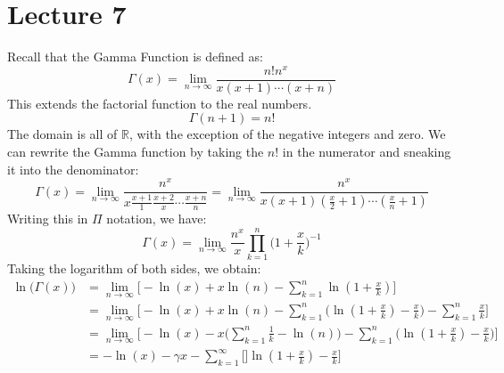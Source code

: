     \section{Lecture 7}
        Recall that the Gamma Function is defined as:
        \begin{equation}
            \Gamma(x)=
            \underset{n\rightarrow\infty}{\lim}
                \frac{n!n^{x}}{x(x+1)\cdots(x+n)}
        \end{equation}
        This extends the factorial function to the real numbers.
        \begin{equation}
            \Gamma(n+1)=n!
        \end{equation}
        The domain is all of $\mathbb{R}$, with the exception of
        the negative integers and zero. We can rewrite the
        Gamma function by taking the $n!$ in the numerator and
        sneaking it into the denominator:
        \begin{equation}
            \Gamma(x)=
            \underset{n\rightarrow\infty}{\lim}
            \frac{n^{x}}
                 {x\frac{x+1}{1}\frac{x+2}{x}\cdots\frac{x+n}{n}}
            =\underset{n\rightarrow\infty}{\lim}
            \frac{n^{x}}
                 {x(x+1)(\frac{x}{2}+1)\cdots(\frac{x}{n}+1)}
        \end{equation}
        Writing this in $\Pi$ notation, we have:
        \begin{equation}
            \Gamma(x)=
            \underset{n\rightarrow\infty}{\lim}
            \frac{n^{x}}{x}
            \prod_{k=1}^{n}\Big(1+\frac{x}{k}\Big)^{-1}
        \end{equation}
        Taking the logarithm of both sides, we obtain:
        \begin{align}
            \ln\Big(\Gamma(x)\Big)&=
            \underset{n\rightarrow\infty}{\lim}
            \Big[
                -\ln(x)+x\ln(n)-\sum_{k=1}^{n}\ln(1+\frac{x}{k})
            \Big]\\
            &=\underset{n\rightarrow\infty}{\lim}
            \Big[
                -\ln(x)+x\ln(n)-
                \sum_{k=1}^{n}\Big(
                    \ln(1+\frac{x}{k})-\frac{x}{k}
                \Big)-\sum_{k=1}^{n}\frac{x}{k}
            \Big]\\
            &=\underset{n\rightarrow\infty}{\lim}
            \Big[-\ln(x)-x\Big(\sum_{k=1}^{n}\frac{1}{k}-\ln(n)\Big)
                 -\sum_{k=1}^{n}\Big(
                    \ln(1+\frac{x}{k})-\frac{x}{k}
                \Big)
            \Big]\\
            &=-\ln(x)-\gamma{x}-\sum_{k=1}^{\infty}\Big[]
                    \ln(1+\frac{x}{k})-\frac{x}{k}
                \Big]
        \end{align}
